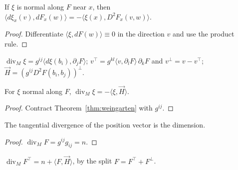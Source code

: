 \begin{theorem}
  \label{thm:weingarten}
  \leanok
  If $\xi$ is normal along $F$ near $x$, then
  $\langle d\xi_x(v), dF_x(w)\rangle = -\langle \xi(x), D^2F_x(v, w)\rangle$.
\end{theorem}

\begin{proof}
  \leanok
  Differentiate $\langle \xi, dF(w)\rangle \equiv 0$ in the direction $v$ and use the product rule.
\end{proof}

\begin{definition}
  \label{def:tangential-divergence}
  \leanok
  $\operatorname{div}_M \xi = g^{ij}\langle d\xi(b_i), \partial_j F\rangle$;
  $v^\top = g^{kl}\langle v, \partial_l F\rangle\,\partial_k F$ and $v^\perp = v - v^\top$;
  $\vec H = (g^{ij} D^2F(b_i, b_j))^\perp$.
\end{definition}

\begin{theorem}
  \label{thm:normal-divergence}
  \leanok
  For $\xi$ normal along $F$, $\operatorname{div}_M \xi = -\langle \xi, \vec H\rangle$.
\end{theorem}

\begin{proof}
  \leanok
  Contract Theorem~\ref{thm:weingarten} with $g^{ij}$.
\end{proof}

\begin{theorem}[$\operatorname{div}_M F = n$]
  \label{thm:div-position}
  \leanok
  The tangential divergence of the position vector is the dimension.
\end{theorem}

\begin{proof}
  \leanok
  $\operatorname{div}_M F = g^{ij} g_{ij} = n$.
\end{proof}

\begin{theorem}
  \label{thm:beltrami-frame}
  \leanok
  $\operatorname{div}_M F^\top = n + \langle F, \vec H\rangle$, by the split
  $F = F^\top + F^\perp$.
\end{theorem}

